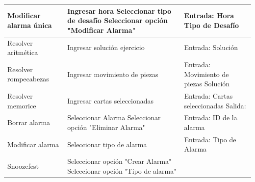 \begin{table}[H]
\begin{tabular}{|p{4cm}|p{5cm}|p{5cm}|}
 \\ \hline
    Modificar alarma única &
    Ingresar hora\newline
    Seleccionar tipo de desafío\newline
    Seleccionar opción "Modificar Alarma"
    &
    Entrada:\newline
    Hora\newline
    Tipo de Desafío\newline
 \\ \hline
    Resolver aritmética &
    Ingresar solución ejercicio\newline
    &
    Entrada:\newline
    Solución\newline
 \\ \hline
    Resolver rompecabezas &
    Ingresar movimiento de piezas
    &
    Entrada:\newline
    Movimiento de piezas\newline
    Solución\newline

 \\ \hline
    Resolver memorice &
    Ingresar cartas seleccionadas
    &
    Entrada:\newline
    2 Cartas seleccionadas\newline
    Salida:

 \\ \hline
    Borrar alarma &
    Seleccionar Alarma\newline
    Seleccionar opción "Eliminar Alarma"
    &
    Entrada:\newline
    ID de la alarma\newline
 \\ \hline
    Modificar alarma &
    Seleccionar tipo de alarma\newline
    &
    Entrada:\newline
    Tipo de Alarma\newline
 \\ \hline
    Snoozefest &
    Seleccionar opción "Crear Alarma"\newline
    Seleccionar opción "Tipo de alarma"\newline
    &
    \\ \hline
\end{tabular}
    
    \label{table:2}
\end{table}
